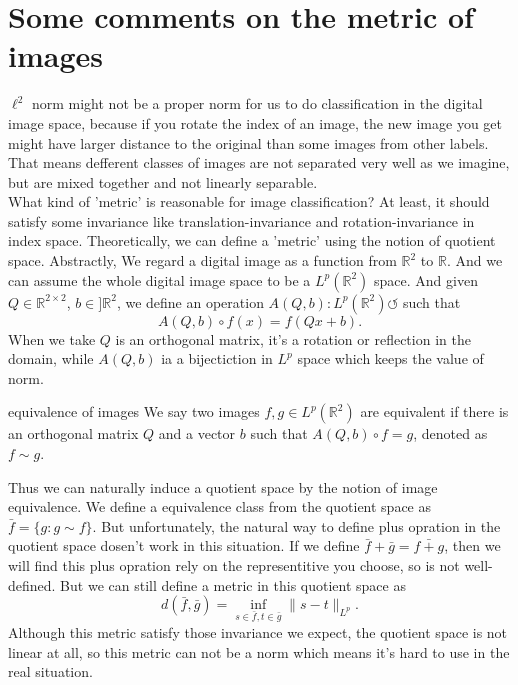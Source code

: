 \newpage

\section{Some comments on the metric of images}
$\ell^2$ norm might not be a proper norm for us to do classification in the digital image space, because if you rotate the index of an image, the new image you get might have larger distance to the original than some images from other labels. That means defferent classes of images are not separated very well as we imagine, but are mixed together and not linearly separable. \\
\indent What kind of 'metric' is reasonable for image classification? At least, it should satisfy some invariance like translation-invariance and rotation-invariance in index space. Theoretically, we can define a 'metric' using the notion of quotient space. Abstractly, We regard a digital image as a function from $\mathbb{R}^2$ to $\mathbb{R}$. And we can assume the whole digital image space to be a $L^p(\mathbb{R}^2)$ space. And given $Q\in \mathbb{R}^{2\times 2}$, $b\in ]\mathbb{R}^2$, we define an operation $A(Q,b): L^p(\mathbb{R}^2)\circlearrowleft$ such that
\[
A(Q,b)\circ f(x) = f(Qx+b).
\]
When we take $Q$ is an orthogonal matrix, it's a rotation or reflection in the domain, while $A(Q,b)$ ia a bijectiction in $L^p$ space which keeps the value of norm.
\begin{definition}{equivalence of images}
	We say two images $f,g \in L^p(\mathbb{R}^2)$ are equivalent if there is an orthogonal matrix $Q$ and a vector $b$ such that $A(Q,b)\circ f = g$, denoted as $f \sim g$.
\end{definition}
Thus we can naturally induce a quotient space by the notion of image equivalence. We define a equivalence class from the quotient space as $\bar{f} = \{g: g\sim f\}$. But unfortunately, the natural way to define plus opration in the quotient space dosen't work in this situation. If we define $\bar{f}+\bar{g} = \bar{f+g}$, then we will find this plus opration rely on the representitive you choose, so is not well-defined. But we can still define a metric in this quotient space as
\begin{equation}
	d(\bar{f},\bar{g}) = \inf_{s\in \bar{f},t\in \bar{g}} \|s-t\|_{L^p}.
\end{equation}
Although this metric satisfy those invariance we expect, the quotient space is not linear at all, so this metric can not be a norm which means it's hard to use in the real situation. \\
